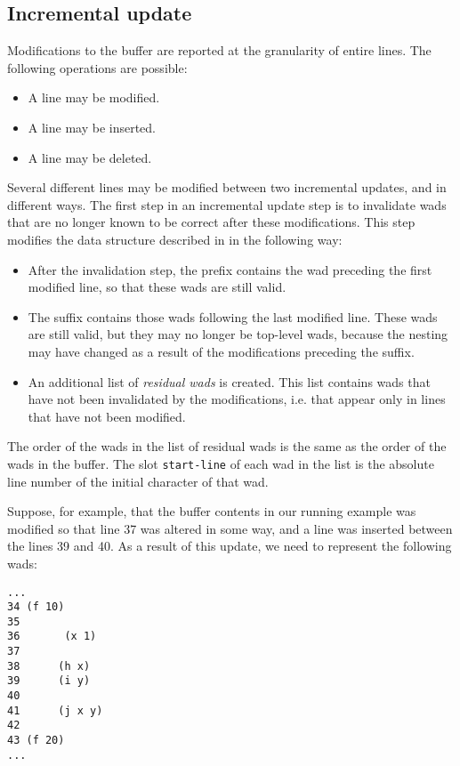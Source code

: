 \subsection{Incremental update}

Modifications to the buffer are reported at the granularity of entire
lines.  The following operations are possible:

\begin{itemize}
\item A line may be modified.
\item A line may be inserted.
\item A line may be deleted.
\end{itemize}

Several different lines may be modified between two incremental
updates, and in different ways.  The first step in an incremental
update step is to invalidate wads that are no longer known to
be correct after these modifications.  This step modifies the data
structure described in
 in the following
way:

\begin{itemize}
\item After the invalidation step, the prefix contains the wad
  preceding the first modified line, so that these wads are still
  valid.
\item The suffix contains those wads following the last
  modified line.  These wads are still valid, but they may no
  longer be top-level wads, because the nesting may have
  changed as a result of the modifications preceding the suffix.
\item An additional list of \emph{residual wads} is created.
  This list contains wads that have not been invalidated by
  the modifications, i.e. that appear only in lines that have not been
  modified.
\end{itemize}

The order of the wads in the list of residual wads
is the same as the order of the wads in the buffer.  The slot
\texttt{start-line} of each wad in the list is the absolute
line number of the initial character of that wad.

Suppose, for example, that the buffer contents in our running example
was modified so that line 37 was altered in some way, and a line was
inserted between the lines 39 and 40.  As a result of this update, we
need to represent the following wads:

\begin{verbatim}
...
34 (f 10)
35
36       (x 1)
37
38      (h x)
39      (i y)
40
41      (j x y)
42
43 (f 20)
...
\end{verbatim}


